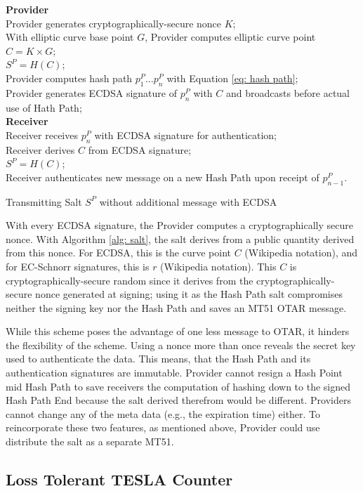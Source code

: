 \documentclass[letterpaper,times]{IONconf/IONconf}
\begin{document}
\begin{algorithm}[H] \label{alg: salt}
\SetAlgoLined
{\bf Provider} \\
Provider generates cryptographically-secure nonce $K$;\\
With elliptic curve base point $G$, Provider computes elliptic curve point $C = K \times G$; \\
$S^P = H(C)$; \\
Provider computes hash path $p^P_1 ... p^P_n$ with Equation \eqref{eq: hash path}; \\
Provider generates ECDSA signature of $p^P_n$ with $C$ and broadcasts before actual use of Hath Path; \\
{\bf Receiver} \\
Receiver receives $p^P_n$ with ECDSA signature for authentication; \\
Receiver derives $C$ from ECDSA signature; \\
$S^P = H(C)$; \\
Receiver authenticates new message on a new Hash Path upon receipt of $p^P_{n-1}$.
\caption{Transmitting Salt $S^P$ without additional message with ECDSA}
\end{algorithm}

With every ECDSA signature, the Provider computes a cryptographically secure nonce.
With Algorithm \ref{alg: salt}, the salt derives from a public quantity derived from this nonce.
For ECDSA, this is the curve point $C$ (Wikipedia notation), and for EC-Schnorr signatures, this is $r$ (Wikipedia notation).
This $C$ is cryptographically-secure random since it derives from the cryptographically-secure nonce generated at signing; using it as the Hash Path salt compromises neither the signing key nor the Hash Path  and saves an MT51 OTAR message.

While this scheme poses the advantage of one less message to OTAR, it hinders the flexibility of the scheme.
Using a nonce more than once reveals the secret key used to authenticate the data.
This means, that the Hash Path and its authentication signatures are immutable.
Provider cannot resign a Hash Point mid Hash Path to save receivers the computation of hashing down to the signed Hash Path End because the salt derived therefrom would be different.
Providers cannot change any of the meta data (e.g., the expiration time) either.
To reincorporate these two features, as mentioned above, Provider could use distribute the salt as a separate MT51.

\subsection{Loss Tolerant TESLA Counter} \label{sec: alert salt}
\end{document}
